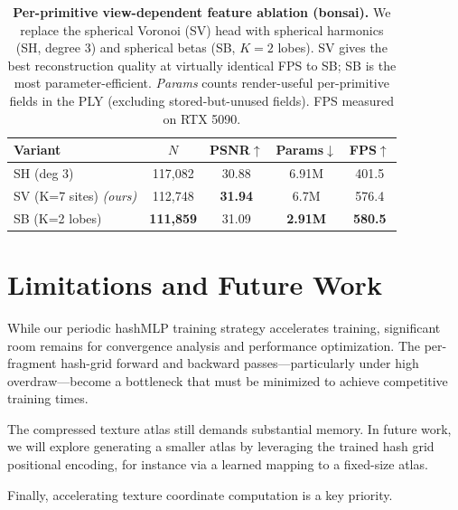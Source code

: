 \documentclass[acmtog,anonymous,review]{acmart}
\newcommand{\first}[1]{\cellcolor{red!25}\textbf{#1}}
\begin{document}
\begin{table}[h]
\centering
\small
\caption{\textbf{Per-primitive view-dependent feature ablation (bonsai).}
We replace the spherical Voronoi (SV) head with spherical harmonics (SH,
degree 3) and spherical betas (SB, $K{=}2$ lobes). SV gives the best
reconstruction quality at virtually identical FPS to SB; SB is the most
parameter-efficient. \emph{Params} counts render-useful per-primitive
fields in the PLY (excluding stored-but-unused fields). FPS measured on
RTX 5090.}
\label{tab:ablation_spherical}
\begin{tabular}{l|cccc}
\toprule
\textbf{Variant} & $N$ & PSNR$\uparrow$ & Params$\downarrow$ & FPS$\uparrow$ \\
\midrule
SH (deg 3)       & 117,082 & 30.88         & 6.91M         & 401.5 \\
SV (K{=}7 sites) \emph{(ours)} & 112,748 & \first{31.94} & 6.7M         & 576.4 \\
SB (K{=}2 lobes) & \first{111,859} & 31.09 & \first{2.91M} & \first{580.5} \\
\bottomrule
\end{tabular}
\end{table}
    
\section{Limitations and Future Work}
While our periodic hashMLP training strategy accelerates training, significant room remains for convergence analysis and performance optimization. The per-fragment hash-grid forward and backward passes—particularly under high overdraw—become a bottleneck that must be minimized to achieve competitive training times.

The compressed texture atlas still demands substantial memory. In future work, we will explore generating a smaller atlas by leveraging the trained hash grid positional encoding, for instance via a learned mapping to a fixed-size atlas.

Finally, accelerating texture coordinate computation is a key priority.
\end{document}
